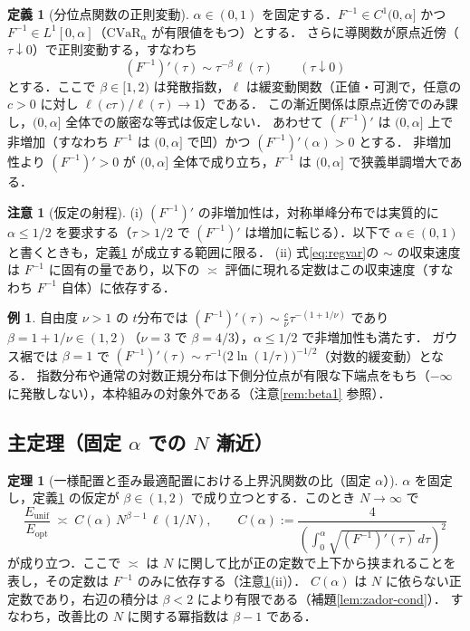 \documentclass[a4paper,10pt]{jsarticle}
\theoremstyle{definition}
\newtheorem{definition}{定義}[section]
\newtheorem{theorem}{定理}[section]
\newtheorem{remark}{注意}[section]
\newtheorem{example}{例}[section]
\newcommand{\CVaR}{\mathrm{CVaR}}
\newcommand{\Finv}{F^{-1}}
\newcommand{\Eunif}{E_{\mathrm{unif}}}
\newcommand{\Eopt}{E_{\mathrm{opt}}}
\begin{document}
\begin{definition}[分位点関数の正則変動]
\label{def:regvar}
$\alpha\in(0,1)$ を固定する．$\Finv\in C^1(0,\alpha]$ かつ $\Finv\in L^1[0,\alpha]$（$\CVaR_\alpha$ が有限値をもつ）とする．
さらに導関数が原点近傍（$\tau\downarrow0$）で正則変動する，すなわち
\begin{equation}
  (\Finv)'(\tau)\sim\tau^{-\beta}\ell(\tau)\qquad(\tau\downarrow0)
  \label{eq:regvar}
\end{equation}
とする．ここで $\beta\in[1,2)$ は発散指数，$\ell$ は緩変動関数（正値・可測で，任意の $c>0$ に対し $\ell(c\tau)/\ell(\tau)\to1$）である．
この漸近関係は原点近傍でのみ課し，$(0,\alpha]$ 全体での厳密な等式は仮定しない．
あわせて $(\Finv)'$ は $(0,\alpha]$ 上で非増加（すなわち $\Finv$ は $(0,\alpha]$ で凹）かつ $(\Finv)'(\alpha)>0$ とする．
非増加性より $(\Finv)'>0$ が $(0,\alpha]$ 全体で成り立ち，$\Finv$ は $(0,\alpha]$ で狭義単調増大である．
\end{definition}

\begin{remark}[仮定の射程]
\label{rem:assumption}
(i) $(\Finv)'$ の非増加性は，対称単峰分布では実質的に $\alpha\le1/2$ を要求する（$\tau>1/2$ で $(\Finv)'$ は増加に転じる）．以下で $\alpha\in(0,1)$ と書くときも，定義\ref{def:regvar} が成立する範囲に限る．
(ii) 式\eqref{eq:regvar}の $\sim$ の収束速度は $\Finv$ に固有の量であり，以下の $\asymp$ 評価に現れる定数はこの収束速度（すなわち $\Finv$ 自体）に依存する．
\end{remark}

\begin{example}
自由度 $\nu>1$ の $t$分布では $(\Finv)'(\tau)\sim\frac{c}{\nu}\tau^{-(1+1/\nu)}$ であり $\beta=1+1/\nu\in(1,2)$（$\nu=3$ で $\beta=4/3$），$\alpha\le1/2$ で非増加性も満たす．
ガウス裾では $\beta=1$ で $(\Finv)'(\tau)\sim\tau^{-1}\bigl(2\ln(1/\tau)\bigr)^{-1/2}$（対数的緩変動）となる．
指数分布や通常の対数正規分布は下側分位点が有限な下端点をもち（$-\infty$ に発散しない），本枠組みの対象外である（注意\ref{rem:beta1} 参照）．
\end{example}

\subsection{主定理（固定 $\alpha$ での $N$ 漸近）}

\begin{theorem}[一様配置と歪み最適配置における上界汎関数の比（固定 $\alpha$）]
\label{thm:alpha}
$\alpha$ を固定し，定義\ref{def:regvar} の仮定が $\beta\in(1,2)$ で成り立つとする．このとき $N\to\infty$ で
\begin{equation}
  \frac{\Eunif}{\Eopt}
  \;\asymp\;C(\alpha)\,N^{\beta-1}\,\ell(1/N),
  \qquad
  C(\alpha):=\frac{4}{\left(\int_0^\alpha\sqrt{(\Finv)'(\tau)}\,d\tau\right)^{2}}
  \label{eq:thm-scaling}
\end{equation}
が成り立つ．ここで $\asymp$ は $N$ に関して比が正の定数で上下から挟まれることを表し，その定数は $\Finv$ のみに依存する（注意\ref{rem:assumption}(ii)）．
$C(\alpha)$ は $N$ に依らない正定数であり，右辺の積分は $\beta<2$ により有限である（補題\ref{lem:zador-cond}）．
すなわち，改善比の $N$ に関する冪指数は $\beta-1$ である．
\end{theorem}
\end{document}
